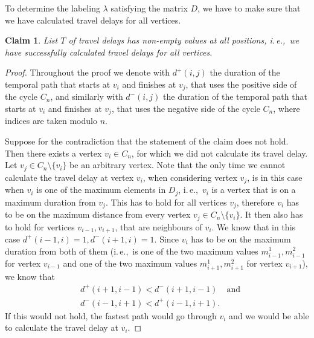 \documentclass[11pt,a4paper]{article}
\newtheorem{claim}[theorem]{Claim}
\theoremstyle{remark}
\theoremstyle{definition}
\newcommand{\ie}{i.\,e.,\ }
\begin{document}
To determine the labeling $\lambda$ satisfying the matrix $D$, we have to make sure that we have calculated travel delays for all vertices.

\begin{claim}
List $T$ of travel delays has non-empty values at all positions, \ie we have successfully calculated travel delays for all vertices.
\end{claim}
\begin{proof}
    Throughout the proof we
    denote with $d^+(i,j)$ the duration of the temporal path that starts at $v_i$ and finishes at $v_j$, that uses the positive side of the cycle $C_n$,
    and similarly with $d^-(i,j)$ the duration of the temporal path that starts at $v_i$ and finishes at $v_j$, that uses the negative side of the cycle $C_n$,
    where indices are taken modulo $n$.
    
    Suppose for the contradiction that the statement of the claim does not hold. Then there exists a vertex $v_i \in C_n$, for which we did not calculate its travel delay.
    Let $v_j \in C_n \setminus \{v_i\}$ be an arbitrary vertex. 
    Note that the only time we cannot calculate the travel delay at vertex $v_i$, when considering vertex $v_j$, is in this case when $v_i$ is one of the maximum elements in $D_j$, \ie $v_i$ is a vertex that is on a maximum duration from $v_j$.
    This has to hold for all vertices $v_j$, therefore $v_i$ has to be on the maximum distance from every vertex $v_j \in C_n \setminus \{v_i\}$.
    It then also has to hold for vertices $v_{i-1}, v_{i+1}$, that are neighbours of $v_i$.
    We know that in this case $d^+(i-1,i) = 1, d^-(i+1,i) = 1$.
    Since $v_i$ has to be on the maximum duration from both of them 
    (\ie is one of the two maximum values $m^1_{i-1}, m^2_{i-1}$ for vertex $v_{i-1}$ and one of the two maximum values $m^1_{i+1}, m^2_{i+1}$ for vertex $v_{i+1}$),
    we know that 
    \begin{align}\label{eq:cycle-travel-delays-all}
        & d^+(i+1,i-1) < d^-(i+1,i-1) & \text{and}\\
        & d^-(i-1,i+1) < d^+(i-1,i+1).
    \end{align}
    If this would not hold, the fastest path would go through $v_i$ and we would be able to calculate the travel delay at $v_i$.
    

\end{proof}
\end{document}
